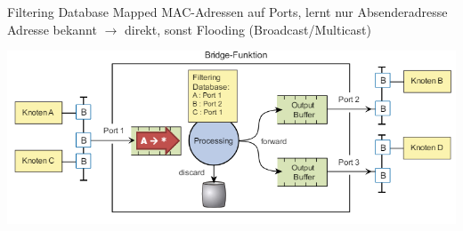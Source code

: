 \begin{definition}{Filtering Database}
    Mapped MAC-Adressen auf Ports, lernt nur Absenderadresse \\
    Adresse bekannt $\rightarrow$ direkt, sonst Flooding (Broadcast/Multicast)\\
    \begin{centering}
        \includegraphics[width=0.9\linewidth]{images/filtering_database.png}    
    \end{centering}
\end{definition}

